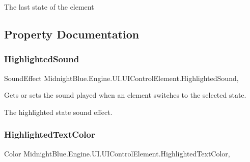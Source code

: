 The last state of the element 



\subsection{Property Documentation}
\hypertarget{class_midnight_blue_1_1_engine_1_1_u_i_1_1_u_i_control_element_abfb0053d243bc79ddab4e9439641f24b}{}\label{class_midnight_blue_1_1_engine_1_1_u_i_1_1_u_i_control_element_abfb0053d243bc79ddab4e9439641f24b} 
\subsubsection{\texorpdfstring{Highlighted\+Sound}{HighlightedSound}}
{\footnotesize\ttfamily Sound\+Effect Midnight\+Blue.\+Engine.\+U\+I.\+U\+I\+Control\+Element.\+Highlighted\+Sound\hspace{0.3cm}{\ttfamily [get]}, {\ttfamily [set]}}



Gets or sets the sound played when an element switches to the selected state. 

The highlighted state sound effect.\hypertarget{class_midnight_blue_1_1_engine_1_1_u_i_1_1_u_i_control_element_aef623a59907f990af21c32bd95c7a6ae}{}\label{class_midnight_blue_1_1_engine_1_1_u_i_1_1_u_i_control_element_aef623a59907f990af21c32bd95c7a6ae} 
\subsubsection{\texorpdfstring{Highlighted\+Text\+Color}{HighlightedTextColor}}
{\footnotesize\ttfamily Color Midnight\+Blue.\+Engine.\+U\+I.\+U\+I\+Control\+Element.\+Highlighted\+Text\+Color\hspace{0.3cm}{\ttfamily [get]}, {\ttfamily [set]}}



